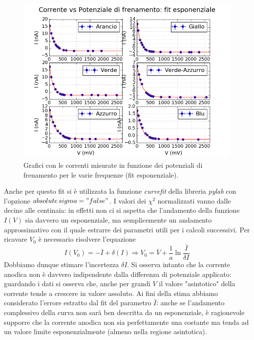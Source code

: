 \documentclass[10pt,a4paper]{article}
\begin{document}
\begin{figure}[!htb]
\centering
\includegraphics[scale=0.9]{fitesponenziale.png}
\caption{Grafici con le correnti misurate in funzione dei potenziali di frenamento per le varie frequenze (fit esponenziale).\label{fig:fitexp}}
\end{figure}

Anche per questo fit si è utilizzata la funzione \emph{curvefit} della libreria \emph{pylab} con l'opzione \emph{$absolute\,sigma = "false"$}.
I valori dei $\chi^2$ normalizzati vanno dalle decine alle centinaia: in effetti non ci si aspetta che l'andamento della funzione $I(V)$ sia davvero un esponenziale, ma semplicemente un andamento approssimativo con il quale estrarre dei parametri utili per i calcoli successivi.
Per ricavare $V_0$ è necessario risolvere l'equazione
\begin{equation}\label{eq:v0exp}
I(V_0)=-\bar{I}+\delta(I)\Rightarrow V_0=\bar{V}+\frac{1}{a}\ln\frac{\bar{I}}{\delta I}
\end{equation} 
Dobbiamo dunque stimare l'incertezza $\delta I$. 
Si osserva intanto che la corrente anodica non è davvero indipendente dalla differenza di potenziale applicato: guardando i dati si osserva che, anche per grandi $V$ il valore "asintotico" della corrente tende a crescere in valore assoluto.
Ai fini della stima abbiamo considerato l'errore estratto dal fit del parametro $\bar{I}$: anche se l'andamento complessivo della curva non sarà ben descritta da un esponenziale, è ragionevole supporre che la corrente anodica non sia perfettamente una costante ma tenda ad un valore limite esponenzialmente (almeno nella regione asintotica).
 
\end{document}
